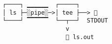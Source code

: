 \documentclass[varwidth,crop]{standalone}
\begin{document}
\begin{verbatim}
┌────┐ ▁▁▁▁▁▁  ┌─────┐   
│ ls ├─░pipe░─>│ tee ├──> 
└────┘ ▔▔▔▔▔▔  └──┬──┘  STDOUT
                  v
                   ls.out
\end{verbatim}
\end{document}
